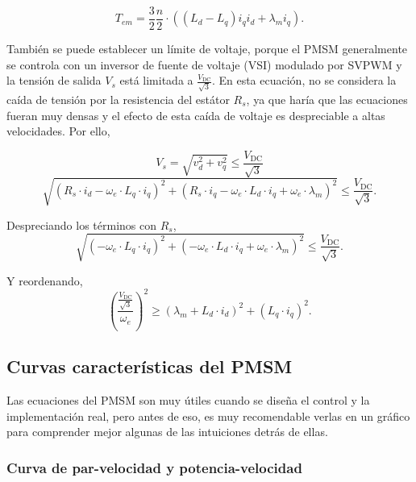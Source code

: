 \begin{equation}
T_{em} = \frac{3}{2}\frac{n}{2}\cdot((L_d - L_q) i_q i_d + \lambda_m i_q) \text{.}
\label{eq_tq_dq} 
\end{equation}

También se puede establecer un límite de voltaje, porque el PMSM generalmente se controla con un inversor de fuente de voltaje (VSI) modulado por SVPWM y la tensión de salida $V_s$ está limitada a \(\frac{V_{\text{DC}}}{\sqrt{3}}\). En esta ecuación, no se considera la caída de tensión por la resistencia del estátor \(R_s\), ya que haría que las ecuaciones fueran muy densas y el efecto de esta caída de voltaje es despreciable a altas velocidades. Por ello,

\begin{equation}
V_s = \sqrt{v_d^2 + v_q^2} \leq \frac{V_{\text{DC}}}{\sqrt{3}}
\end{equation}
\begin{equation}
	\sqrt{\left(R_s\cdot i_d - \omega_e \cdot L_q \cdot i_q\right)^2 + \left(R_s\cdot i_q - \omega_e \cdot L_d \cdot i_q + \omega_e \cdot \lambda_m\right)^2} \leq \frac{V_{\text{DC}}}{\sqrt{3}} \text{.}
\end{equation}

Despreciando los términos con \(R_s\),
\begin{equation}
	\sqrt{\left(- \omega_e \cdot L_q \cdot i_q\right)^2 + \left(- \omega_e \cdot L_d \cdot i_q + \omega_e \cdot \lambda_m\right)^2} \leq \frac{V_{\text{DC}}}{\sqrt{3}} \text{.}
\end{equation}
 
Y reordenando,
\begin{equation}
	\left(\frac{\frac{V_{\text{DC}}}{\sqrt{3}}}{\omega_e}\right)^2 \geq \left(\lambda_m+L_d\cdot i_d\right)^2+(L_q\cdot i_q)^2 \text{.}
	\label{eq_vle_dq}
\end{equation}

\subsection{Curvas características del PMSM}

Las ecuaciones del PMSM son muy útiles cuando se diseña el control y la implementación real, pero antes de eso, es muy recomendable verlas en un gráfico para comprender mejor algunas de las intuiciones detrás de ellas.

\subsubsection{Curva de par-velocidad y potencia-velocidad}


